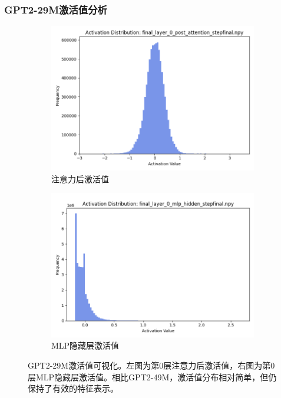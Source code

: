 \documentclass{article}
\begin{document}
\subsubsection{GPT2-29M激活值分析}
\begin{figure}[H]
\centering
\begin{subfigure}[b]{0.45\textwidth}
\includegraphics[width=\textwidth]{../visualize/activations/GPT2-29M/final_layer_0_post_attention_stepfinal.png}
\caption{注意力后激活值}
\label{fig:act_29m_l0_post}
\end{subfigure}
\hfill
\begin{subfigure}[b]{0.45\textwidth}
\includegraphics[width=\textwidth]{../visualize/activations/GPT2-29M/final_layer_0_mlp_hidden_stepfinal.png}
\caption{MLP隐藏层激活值}
\label{fig:act_29m_l0_mlp}
\end{subfigure}
\caption{GPT2-29M激活值可视化。左图为第0层注意力后激活值，右图为第0层MLP隐藏层激活值。相比GPT2-49M，激活值分布相对简单，但仍保持了有效的特征表示。}
\label{fig:act_29m_comparison}
\end{figure}
\end{document}
